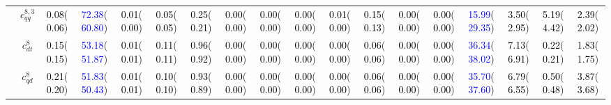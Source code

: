 \documentclass{article}
\begin{document}
\begin{landscape}
\begin{table}[H]
\begin{tabular}{|c|c|c|c|c|c|c|c|c|c|c|c|c|c|c|c|c|c|}
 & $c_{qq}^{8,3}$ & \textcolor{black}{0.08}(\textcolor{black}{0.06}) & \textcolor{blue}{72.38}(\textcolor{blue}{60.80}) & \textcolor{black}{0.01}(\textcolor{black}{0.00}) & \textcolor{black}{0.05}(\textcolor{black}{0.05}) & \textcolor{black}{0.25}(\textcolor{black}{0.21}) & \textcolor{black}{0.00}(\textcolor{black}{0.00}) & \textcolor{black}{0.00}(\textcolor{black}{0.00}) & \textcolor{black}{0.00}(\textcolor{black}{0.00}) & \textcolor{black}{0.01}(\textcolor{black}{0.00}) & \textcolor{black}{0.15}(\textcolor{black}{0.13}) & \textcolor{black}{0.00}(\textcolor{black}{0.00}) & \textcolor{black}{0.00}(\textcolor{black}{0.00}) & \textcolor{blue}{15.99}(\textcolor{blue}{29.35}) & \textcolor{black}{3.50}(\textcolor{black}{2.95}) & \textcolor{black}{5.19}(\textcolor{black}{4.42}) & \textcolor{black}{2.39}(\textcolor{black}{2.02})\\ \cline{2-18}
 & $c_{dt}^{8}$ & \textcolor{black}{0.15}(\textcolor{black}{0.15}) & \textcolor{blue}{53.18}(\textcolor{blue}{51.87}) & \textcolor{black}{0.01}(\textcolor{black}{0.01}) & \textcolor{black}{0.11}(\textcolor{black}{0.11}) & \textcolor{black}{0.96}(\textcolor{black}{0.92}) & \textcolor{black}{0.00}(\textcolor{black}{0.00}) & \textcolor{black}{0.00}(\textcolor{black}{0.00}) & \textcolor{black}{0.00}(\textcolor{black}{0.00}) & \textcolor{black}{0.00}(\textcolor{black}{0.00}) & \textcolor{black}{0.06}(\textcolor{black}{0.06}) & \textcolor{black}{0.00}(\textcolor{black}{0.00}) & \textcolor{black}{0.00}(\textcolor{black}{0.00}) & \textcolor{blue}{36.34}(\textcolor{blue}{38.02}) & \textcolor{black}{7.13}(\textcolor{black}{6.91}) & \textcolor{black}{0.22}(\textcolor{black}{0.21}) & \textcolor{black}{1.83}(\textcolor{black}{1.75})\\ \cline{2-18}
 & $c_{qd}^{8}$ & \textcolor{black}{0.21}(\textcolor{black}{0.20}) & \textcolor{blue}{51.83}(\textcolor{blue}{50.43}) & \textcolor{black}{0.01}(\textcolor{black}{0.01}) & \textcolor{black}{0.10}(\textcolor{black}{0.10}) & \textcolor{black}{0.93}(\textcolor{black}{0.89}) & \textcolor{black}{0.00}(\textcolor{black}{0.00}) & \textcolor{black}{0.00}(\textcolor{black}{0.00}) & \textcolor{black}{0.00}(\textcolor{black}{0.00}) & \textcolor{black}{0.00}(\textcolor{black}{0.00}) & \textcolor{black}{0.06}(\textcolor{black}{0.06}) & \textcolor{black}{0.00}(\textcolor{black}{0.00}) & \textcolor{black}{0.00}(\textcolor{black}{0.00}) & \textcolor{blue}{35.70}(\textcolor{blue}{37.60}) & \textcolor{black}{6.79}(\textcolor{black}{6.55}) & \textcolor{black}{0.50}(\textcolor{black}{0.48}) & \textcolor{black}{3.87}(\textcolor{black}{3.68})\\ \cline{2-18}

\end{tabular}
\end{table}
\end{landscape}
\end{document}
